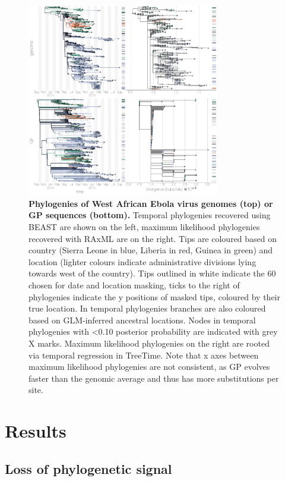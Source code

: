 \documentclass[11pt,oneside,letterpaper]{article}
\begin{document}
\begin{figure}[h]
 \centering
	\includegraphics[width=0.75\textwidth]{figures/fig1_trees.png}
	\caption{\textbf{Phylogenies of West African Ebola virus genomes (top) or GP sequences (bottom).}
	Temporal phylogenies recovered using BEAST are shown on the left, maximum likelihood phylogenies recovered with RAxML are on the right.
  Tips are coloured based on country (Sierra Leone in blue, Liberia in red, Guinea in green) and location (lighter colours indicate administrative divisions lying towards west of the country).
  Tips outlined in white indicate the 60 chosen for date and location masking, ticks to the right of phylogenies indicate the y positions of masked tips, coloured by their true location.
  In temporal phylogenies branches are also coloured based on GLM-inferred ancestral locations.
  Nodes in temporal phylogenies with <0.10 posterior probability are indicated with grey X marks.
  Maximum likelihood phylogenies on the right are rooted via temporal regression in TreeTime.
  Note that x axes between maximum likelihood phylogenies are not consistent, as GP evolves faster than the genomic average and thus has more substitutions per site.
	}
	\label{trees}
\end{figure}

\section*{Results}

\subsection*{Loss of phylogenetic signal}
\end{document}

